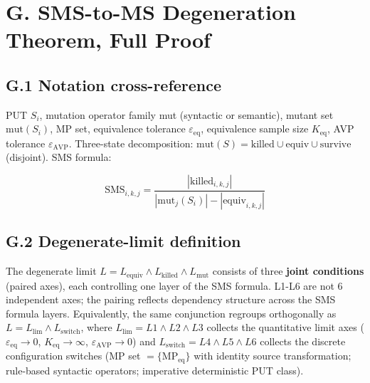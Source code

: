 \documentclass[manuscript,screen,review]{acmart}
\begin{document}

\section{G. SMS-to-MS Degeneration Theorem, Full Proof}\label{g.-sms-ms-degeneration-theorem-full-proof}

\subsection{G.1 Notation cross-reference}\label{g.1-notation-cross-reference-with-2.1}

PUT $S_i$, mutation operator family mut (syntactic or semantic),
mutant set $\mathrm{mut}(S_i)$, MP set, equivalence tolerance $\varepsilon_{\mathrm{eq}}$, equivalence
sample size $K_{\mathrm{eq}}$, AVP tolerance $\varepsilon_{\mathrm{AVP}}$. Three-state decomposition:
$\mathrm{mut}(S)=\mathrm{killed} \cup \mathrm{equiv} \cup \mathrm{survive}$ (disjoint). SMS
formula:

\[
\mathrm{SMS}_{i,k,j} = \frac{|\mathrm{killed}_{i,k,j}|}{|\mathrm{mut}_j(S_i)| - |\mathrm{equiv}_{i,k,j}|}
\]

\subsection{G.2 Degenerate-limit definition}\label{g.2-degenerate-limit-definition-r-8-p1-3-revision-3-joint-conditions}

The degenerate limit $L = L_{\mathrm{equiv}} \wedge L_{\mathrm{killed}} \wedge L_{\mathrm{mut}}$
consists of three \textbf{joint conditions} (paired axes), each
controlling one layer of the SMS formula. L1-L6 are not 6 independent
axes; the pairing reflects dependency structure across the SMS formula
layers. Equivalently, the same conjunction regroups orthogonally as
$L = L_{\mathrm{lim}} \wedge L_{\mathrm{switch}}$, where
$L_{\mathrm{lim}} = L1 \wedge L2 \wedge L3$ collects the quantitative
limit axes ($\varepsilon_{\mathrm{eq}} \to 0$,
$K_{\mathrm{eq}} \to \infty$, $\varepsilon_{\mathrm{AVP}} \to 0$) and
$L_{\mathrm{switch}} = L4 \wedge L5 \wedge L6$ collects the discrete
configuration switches (MP set $= \{\mathrm{MP}_{\mathrm{eq}}\}$ with
identity source transformation;
rule-based syntactic operators; imperative deterministic PUT class).
\end{document}
